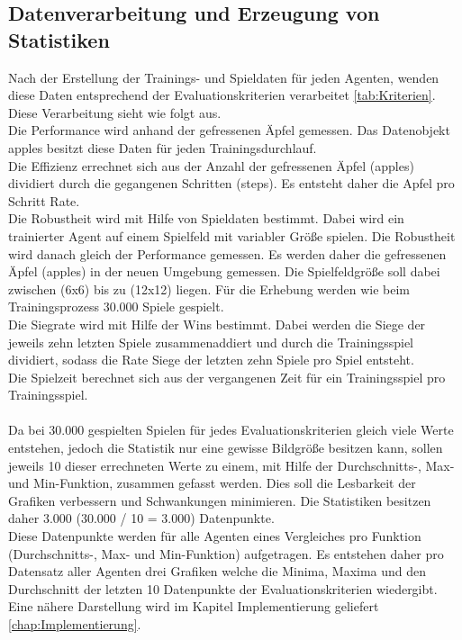\subsection{Datenverarbeitung und Erzeugung von Statistiken} \label{sec:Konzept_Datenverarbeitung}
Nach der Erstellung der Trainings- und Spieldaten für jeden Agenten, wenden diese Daten entsprechend der Evaluationskriterien verarbeitet \ref{tab:Kriterien}. Diese Verarbeitung sieht wie folgt aus.\\
Die Performance wird anhand der gefressenen Äpfel gemessen. Das Datenobjekt apples besitzt diese Daten für jeden Trainingsdurchlauf.\\
Die Effizienz errechnet sich aus der Anzahl der gefressenen Äpfel (apples) dividiert durch die gegangenen Schritten (steps). Es entsteht daher die Apfel pro Schritt Rate.\\
Die Robustheit wird mit Hilfe von Spieldaten bestimmt. Dabei wird ein trainierter Agent auf einem Spielfeld mit variabler Größe spielen. Die Robustheit wird danach gleich der Performance gemessen. Es werden daher die gefressenen Äpfel (apples) in der neuen Umgebung gemessen. Die Spielfeldgröße soll dabei zwischen (6x6) bis zu (12x12) liegen. Für die Erhebung werden wie beim Trainingsprozess 30.000 Spiele gespielt.\\
Die Siegrate wird mit Hilfe der Wins bestimmt. Dabei werden die Siege der jeweils zehn letzten Spiele zusammenaddiert und durch die Trainingsspiel dividiert, sodass die Rate Siege der letzten zehn Spiele pro Spiel entsteht.\\
Die Spielzeit berechnet sich aus der vergangenen Zeit für ein Trainingsspiel pro Trainingsspiel.\\
\\Da bei 30.000 gespielten Spielen für jedes Evaluationskriterien gleich viele Werte entstehen, jedoch die Statistik nur eine gewisse Bildgröße besitzen kann, sollen jeweils 10 dieser errechneten Werte zu einem, mit Hilfe der Durchschnitts-, Max- und Min-Funktion, zusammen gefasst werden. Dies soll die Lesbarkeit der Grafiken verbessern und Schwankungen minimieren. Die Statistiken besitzen daher 3.000 (30.000 / 10 = 3.000) Datenpunkte.\\
Diese Datenpunkte werden für alle Agenten eines Vergleiches pro Funktion (Durchschnitts-, Max- und Min-Funktion) aufgetragen. Es entstehen daher pro Datensatz aller Agenten drei Grafiken welche die Minima, Maxima und den Durchschnitt der letzten 10 Datenpunkte der Evaluationskriterien wiedergibt.\\
Eine nähere Darstellung wird im Kapitel Implementierung geliefert \ref{chap:Implementierung}.
